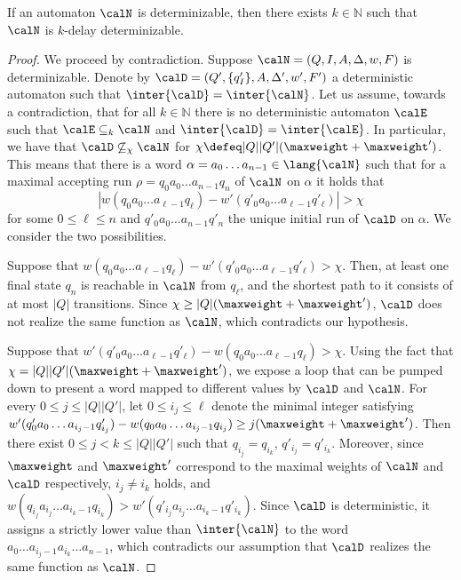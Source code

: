 \documentclass[a4paper]{article}
\begin{document}
\begin{theorem}\label{thm:semi-det}
	If an automaton $\calN$ is determinizable, then there exists $k
	\in \mathbb{N}$ such that $\calN$ is $k$-delay determinizable.
\end{theorem}
\begin{proof}
	We proceed by contradiction. Suppose $\calN = (Q,I,A,\Delta,w,F)$ is
	determinizable. Denote by $\calD = (Q',\{q_I'\},A,\Delta',w',F')$ a
	deterministic automaton such that $\inter{\calD} =
	\inter{\calN}$. Let us assume, towards a contradiction,
	that for all $k \in \mathbb{N}$ there is
	no deterministic automaton $\calE$ such that $\calE \subseteq_k \calN$
	and $\inter{\calD} = \inter{\calE}$.
	In particular,
	we have that $\calD \not\subseteq_\chi \calN$ for $\chi \defeq
	|Q||Q'|(\maxweight + \maxweight')$. This means that there is a word
	$\alpha = a_0 \dots a_{n-1} \in \lang{\calN}$ such that for a maximal
	accepting run $\rho = q_0 a_0 \dots a_{n-1} q_n$ of $\calN$ on $\alpha$
	it holds that
	\begin{equation}\label{eqn:bigdiff-abs}
		\left| w(q_0 a_0\dots a_{\ell-1} q_\ell) -
		w'(q'_0 a_0 \dots a_{\ell-1} q'_\ell) \right| > \chi
	\end{equation}
	for some $0 \le \ell \le n$ and $q'_0 a_0 \dots a_{n-1} q'_n$ the
	unique initial run of $\calD$ on $\alpha$.
	We consider the two possibilities.
	
	Suppose that $w(q_0 a_0\dots a_{\ell-1} q_\ell) - w'(q'_0 a_0 \dots
	a_{\ell-1} q'_\ell) > \chi$.  Then, at least one final state $q_n$ is
	reachable in $\calN$ from $q_\ell$, and the shortest path to it consists
	of at most $|Q|$ transitions. Since $\chi \ge |Q|(\maxweight +
	\maxweight')$, $\calD$ does not realize the same function as $\calN$,
	which contradicts our hypothesis. 
	
	Suppose that
	\(
		w'(q'_0 a_0 \dots a_{\ell-1} q'_\ell) -
		w(q_0 a_0 \dots a_{\ell-1} q_\ell) > \chi.
	\)
	Using the fact that $\chi = |Q||Q'|(\maxweight + \maxweight')$, we
	expose a loop that can be pumped down to present a word mapped to
	different values by $\calD$ and $\calN$.  For every $0 \leq j \leq
	|Q||Q'|$, let $0 \leq i_j \leq \ell$ denote the minimal integer
	satisfying $w'(q'_0  a_0 \dots a_{i_j-1}q'_{i_j}) - w(q_0 a_0 \dots
	a_{i_j-1}q_{i_j}) \geq j(\maxweight + \maxweight')$.  Then there exist
	$0 \leq j < k \leq |Q||Q'|$ such that $q_{i_j} = q_{i_k}$, $q'_{i_j} =
	q'_{i_k}$.  Moreover, since $\maxweight$ and $\maxweight'$ correspond to
	the maximal weights of $\calN$ and $\calD$ respectively, $i_j \neq i_k$
	holds, and
	\(
		w(q_{i_j}a_{i_j} \dots a_{i_k-1}q_{i_k}) > w'(q'_{i_j} a_{i_j}
		\dots a_{i_k-1}q'_{i_k}).
	\)
	Since $\calD$ is deterministic, it assigns a strictly lower value than
	$\inter{\calN}$ to the word $a_0 \dots a_{i_j-1} a_{i_k} \dots a_{n-1}$,
	which contradicts our assumption that $\calD$ realizes the same function
	as $\calN$.
\end{proof}
\end{document}
